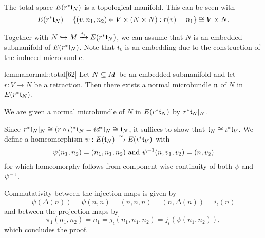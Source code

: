 \begin{myparagraph}
    The total space $E(r^*\mathfrak{t}_N)$ is a topological manifold.
    This can be seen with
    \[ E(r^*\mathfrak{t}_N) = \{(v, n_1, n_2) \in V \times (N \times N):r(v) = n_1\} \cong V \times N. \]

    Together with $N \hookrightarrow{} M \xrightarrow{i_{\mathfrak{t}}} E(r^*\mathfrak{t}_N)$, we can assume that
    $N$ is an embedded submanifold of $E(r^*\mathfrak{t}_N)$.
    Note that $i_{\mathfrak{t}}$ is an embedding due to the construction of the induced microbundle.
\end{myparagraph}

\begin{mystatement}{lemma}{normal::total}[62]
    Let $N \subseteq{} M$ be an embedded submanifold and let $r: V \to N$ be a retraction.
    Then there exists a normal microbundle $\mathfrak{n}$ of $N$ in $E(r^*\mathfrak{t}_N)$. %
\end{mystatement}

\begin{myproof}
    We are given a normal microbundle of $N$ in $E(r^*\mathfrak{t}_N)$ by $r^*\mathfrak{t}_N\vert_{N}$.
    
    Since $r^*\mathfrak{t}_N\vert_{N} \cong (r \circ \iota)^*\mathfrak{t}_N = id^*\mathfrak{t}_N \cong \mathfrak{t}_N$,
    it suffices to show that $\mathfrak{t}_N \cong \iota^*\mathfrak{t}_V$.
    We define a homeomorphism $\psi: E(\mathfrak{t}_N) \xrightarrow{\sim} E(\iota^*\mathfrak{t}_V)$ with
    \[ \psi(n_1, n_2) = (n_1, n_1, n_2) \text{ and } \psi^{-1}(n, v_1, v_2) = (n, v_2) \]
    for which homeomorphy follows from component-wise
    continuity of both $\psi$ and $\psi^{-1}$.
    
    Commutativity between the injection maps is given by
    \[ \psi(\Delta(n)) = \psi(n, n) = (n, n, n) = (n, \Delta(n)) = i_\iota(n) \]
    and between the projection maps by
    \[ \pi_1(n_1, n_2) = n_1 = j_\iota(n_1, n_1, n_2) = j_\iota(\psi(n_1, n_2)), \]
    which concludes the proof.
    
\end{myproof}